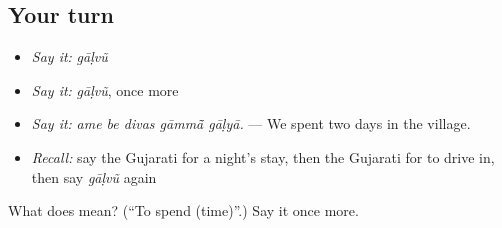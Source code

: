 \subsection*{Your turn}
\begin{itemize}
\raggedright
  \item \emph{Say it:} \emph{gāḷvũ}
  \item \emph{Say it:} \emph{gāḷvũ}, once more
  \item \emph{Say it:} \emph{ame be divas gāmmā̃ gāḷyā.} — We spent two days in the village.
  \item \emph{Recall:} say the Gujarati for a night's stay, then the Gujarati for to drive in, then say \emph{gāḷvũ} again
\end{itemize}

\begin{tcolorbox}[breakable,colback=teal!4,colframe=teal!35!black,title={Before you move on}]
What does  mean? (\textquotedblleft{}To spend (time)\textquotedblright{}.) Say it once more.
\end{tcolorbox}
